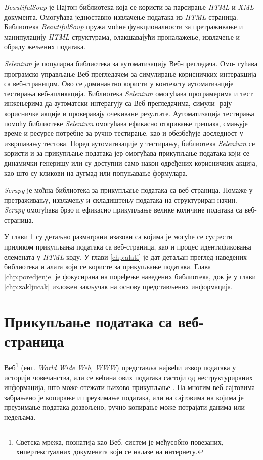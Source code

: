 \documentclass[12pt,oneside]{memoir}
\begin{document}
\textit{BeautifulSoup} је Пајтон библиотека која се користи за парсирање \textit{HTML} и \textit{XML} документа. Омогућава једноставно извлачење података из \textit{HTML} страница. Библиотека \textit{BeautifulSoup} пружа моћне функционалности за претраживање и манипулацију \textit{HTML} структурама, олакшавајући проналажење, извлачење и обраду жељених података.

\textit{Selenium} је популарна библиотека за аутоматизацију Веб-прегледача. Омо-
гућава програмско управљање Веб-прегледачем за симулирање корисничких
интеракција са веб-страницом. Ово се доминантно користи у контексту аутоматизације тестирања веб-апликација. Библиотека \textit{Selenium} омогућава програмерима и тест инжењерима да аутоматски интерагују са Веб-прегледачима, симули-
рају корисничке акције и проверавају очекиване резултате. Аутоматизација тестирања помоћу библиотеке \textit{Selenium} омогућава ефикасно откривање грешака, смањује
време и ресурсе потребне за ручно тестирање, као и обезбеђује доследност у извршавању тестова. Поред аутоматизације у тестирању, библиотека \textit{Selenium} се користи и за прикупљање података јер омогућава прикупљање података који се динамички генеришу или су доступни само након одређених корисничких акција, као што су кликови на дугмад или попуњавање формулара.

\textit{Scrapy} је моћна библиотека за прикупљање података са веб-страница. Помаже у претраживању, извлачењу и складиштењу података на структуриран начин. \textit{Scrapy} омогућава брзо и ефикасно прикупљање велике количине података са веб-страница. 

У глави \ref{chp:prikupljanje} су детаљно разматрани изазови са којима је могуће се сусрести приликом прикупљања података са веб-страница, као и процес идентификовања елемената у \textit{HTML} коду. У глави \ref{chp:alati} је дат детаљан преглед наведених библиотека и алата који се користе за прикупљање података. Глава \ref{chp:poredjenje} је фокусирана на поређење наведених библиотека, док је у глави \ref{chp:zakljucak} изложен закључак на основу представљених информација.

\chapter{Прикупљање података са веб-страница}
\label{chp:prikupljanje}
Веб\footnote{Светска мрежа, познатија као Веб, систем је међусобно повезаних, хипертекстуалних докумената који се налазе на интернету.} (енг. \textit{World Wide Web, WWW}) представља највећи извор података у историји човечанства, али се већина ових података састоји од неструктурираних информација, што може отежати њихово прикупљање \cite{osmarPaper}. 
На многим веб-сајтовима забрањено је копирање и преузимање података, али на сајтовима на којима је преузимање података дозвољено, ручно копирање може потрајати данима или недељама.
\end{document}
